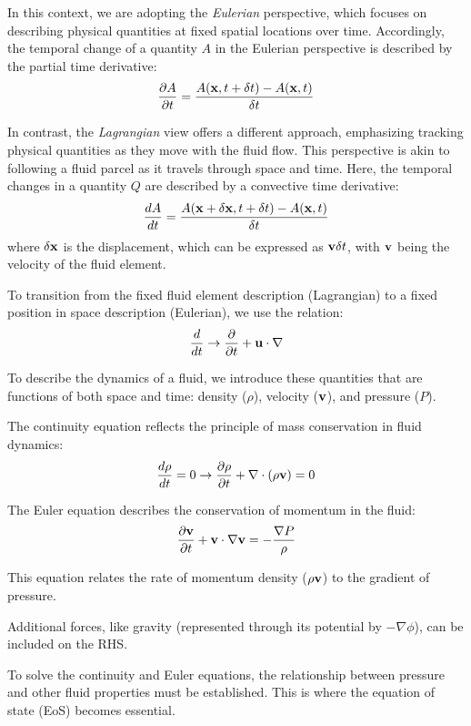 In this context, we are adopting the \emph{Eulerian} perspective, which focuses on describing physical quantities at fixed spatial locations  over time. 
%
Accordingly, the temporal change of a quantity \(A\) in the Eulerian perspective is described by the partial time derivative:
%
\[
\frac{\partial A}{\partial t} = \frac{A(\vb x, t +\delta t) - A(\vb x, t)}{\delta t} 
\]

In contrast, the \emph{Lagrangian} view offers a different approach, emphasizing tracking physical quantities as they move with the fluid flow. This perspective is akin to following a fluid parcel as it travels through space and time. Here, the temporal changes in a quantity \(Q\) are described by a convective time derivative:
%
\[
\frac{d A}{dt} = \frac{A(\vb x + \delta \vb x, t + \delta t) - A(\vb x, t)}{\delta t} 
\]
%
where \( \delta \vb x \) is the displacement, which can be expressed as \( \vb v \delta t \), with \( \vb v \) being the velocity of the fluid element.

To transition from the fixed fluid element description (Lagrangian) to a fixed position in space description (Eulerian), we use the relation:
%
\begin{equation}
\frac{d}{dt} \rightarrow \frac{\partial}{\partial t} + \vb u \cdot \nabla
\end{equation}

To describe the dynamics of a fluid, we introduce these quantities that are functions of both space and time: density (\( \rho \)), velocity (\( \vb v \)), and pressure (\( P \)).

The continuity equation reflects the principle of mass conservation in fluid dynamics:
%
\begin{equation}
\frac{d\rho}{dt}  = 0 \rightarrow \frac{\partial \rho}{\partial t} + \nabla \cdot (\rho \vb v) = 0
\end{equation}

The Euler equation describes the conservation of momentum in the fluid:
%
\begin{equation}
\frac{\partial \vb v}{\partial t} + \vb v \cdot \nabla \vb v = - \frac{\nabla P}{\rho}
\end{equation}

This equation relates the rate of momentum density (\( \rho \vb v \)) to the gradient of pressure.

Additional forces, like gravity (represented through its potential by \( - \nabla \phi \)), can be included on the RHS.

To solve the continuity and Euler equations, the relationship between pressure and other fluid properties must be established. This is where the equation of state (EoS) becomes essential.

